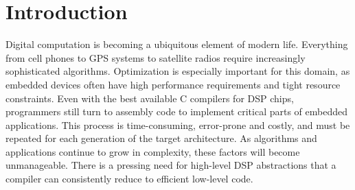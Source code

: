 

\section{Introduction}
Digital computation is becoming a ubiquitous element of
modern life.  Everything from cell phones to GPS systems to satellite
radios require increasingly sophisticated algorithms.  Optimization is
especially important for this domain, as embedded devices often have
high performance requirements and tight resource constraints.  Even
with the best available C compilers for DSP chips, programmers still
turn to assembly code to implement critical parts of embedded
applications.  This process is time-consuming, error-prone and
costly, and must be repeated for each generation of the target
architecture.  As algorithms and applications continue to grow in
complexity, these factors will become unmanageable.  There is a
pressing need for high-level DSP abstractions that a compiler can
consistently reduce to efficient low-level code.


